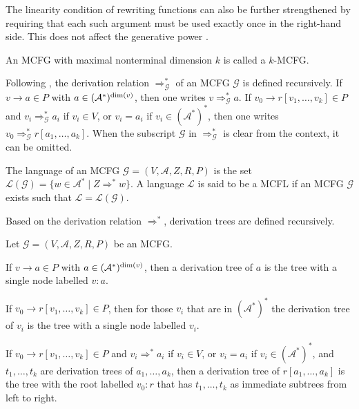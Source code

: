 \documentclass[
    a4paper,
    12pt,
    twoside,
    BCOR=12mm,
    parskip=half,
    chapterprefix,
    numbers=noenddot,
    bibliography=totoc
]{scrbook}
\begin{document}
\begin{remark}
	The linearity condition of rewriting functions can also be further strengthened by requiring that each such argument must be used exactly once in the right-hand side. This does not affect the generative power \citep[Lemma 2.2]{seki_multiple_1991}.
\end{remark}

An \gls{MCFG} with maximal nonterminal dimension $k$ is called a $k$-MCFG.

Following \citet{seki_generative_2008}, the derivation relation $\Rightarrow^*_\mathcal{G}$ of an \gls{MCFG} $\mathcal{G}$ is defined recursively.
If $v \to a \in P$ with $a \in (\mathcal{A}^*)^{\mathrm{dim}(v)}$, then one writes $v \Rightarrow^*_\mathcal{G} a$.
If $v_0 \to r[v_1,\ldots,v_k] \in P$ and $v_i \Rightarrow^*_\mathcal{G} a_i$ if $v_i \in V$, or $v_i=a_i$ if $v_i \in (\mathcal{A}^*)^*$, then one writes $v_0 \Rightarrow^*_\mathcal{G} r[a_1,\ldots,a_k]$. When the subscript $\mathcal{G}$ in $\Rightarrow^*_\mathcal{G}$ is clear from the context, it can be omitted.

\pagebreak


The language of an \gls{MCFG} $\mathcal{G}=(V,\mathcal{A},Z,R,P)$ is the set $\mathcal{L}(\mathcal{G})=\{ w \in \mathcal{A}^* \mid Z \Rightarrow^* w \}$. A language $\mathcal{L}$ is said to be a \gls{MCFL} if an \gls{MCFG} $\mathcal{G}$ exists such that $\mathcal{L} = \mathcal{L}(\mathcal{G})$.

Based on the derivation relation $\Rightarrow^*$, derivation trees are defined recursively.

\begin{definition}
  \label{def:derivtree_mcfg}
	Let $\mathcal{G}=(V,\mathcal{A},Z,R,P)$ be an \gls{MCFG}.
	
	If $v \to a \in P$ with $a \in (\mathcal{A}^*)^{\mathrm{dim}(v)}$, then a derivation tree of $a$ is the tree with a single node labelled $v:a$.
	
	If $v_0 \to r[v_1,\ldots,v_k] \in P$, then for those $v_i$ that are in $(\mathcal{A}^*)^*$ the derivation tree of $v_i$ is the tree with a single node labelled $v_i$. 
	
	If $v_0 \to r[v_1,\ldots,v_k] \in P$ and $v_i \Rightarrow^* a_i$ if $v_i \in V$, or $v_i=a_i$ if $v_i \in (\mathcal{A}^*)^*$, and $t_1,\ldots,t_k$ are derivation trees of $a_1,\ldots,a_k$, then a derivation tree of $r[a_1,\ldots,a_k]$ is the tree with the root labelled $v_0 : r$ that has $t_1,\ldots,t_k$ as immediate subtrees from left to right.
\end{definition}
\end{document}

